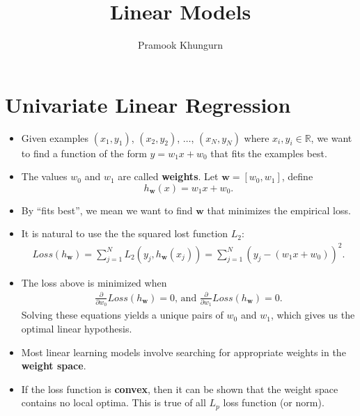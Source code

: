 \documentclass[10pt]{article}
\title{Linear Models}
\author{Pramook Khungurn}
\begin{document}
\maketitle

\section{Univariate Linear Regression}
\begin{itemize}
    \item Given examples $(x_1, y_1)$, $(x_2, y_2)$, $\dotsc$, 
        $(x_N, y_N)$
        where $x_i, y_i \in \mathbb{R}$, we want to find
        a function of the form $y = w_1 x + w_0$ that
        fits the examples best.
        
    \item The values $w_0$ and $w_1$ are called {\bf weights}.
        Let $\mathbf{w} = [w_0, w_1]$, define
        $$h_\mathbf{w}(x) = w_1 x + w_0.$$
    
    \item By ``fits best'', we mean we want to find
        $\mathbf{w}$ that minimizes the empirical loss.
        
    \item It is natural to use the the squared lost function
        $L_2$:
        \begin{align*}
            Loss(h_\mathbf{w})
            = \sum_{j=1}^N L_2(y_j, h_\mathbf{w}(x_j))
            = \sum_{j=1}^N (y_j - (w_1x + w_0))^2.
        \end{align*}
        
    \item The loss above is minimized when 
        \begin{align*}
            \frac{\partial}{\partial w_0}Loss(h_{\mathbf{w}}) = 0
            \mbox{, and }
            \frac{\partial}{\partial w_1}Loss(h_{\mathbf{w}}) = 0.
        \end{align*}
        Solving these equations yields a unique pairs of 
        $w_0$ and $w_1$, which gives us the optimal linear
        hypothesis.
        
    \item Most linear learning models involve searching for
        appropriate weights in the {\bf weight space}.
    
    \item If the loss function is {\bf convex}, then it
        can be shown that the weight space contains no local
        optima. This is true of all $L_p$ loss function (or norm).
        

\end{itemize}
\end{document}
